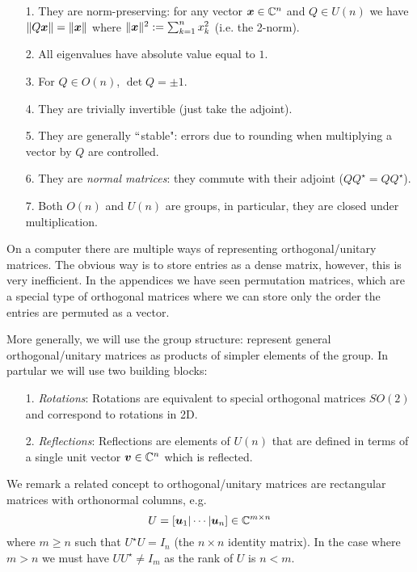 \begin{itemize}
\item[1. ] They are norm-preserving: for any vector $\bm{{\mbox{\boldmath$x$\unboldmath}}} \in {\mathbb C}^n$ and $Q \ensuremath{\in} U(n)$    we have $\|Q \bm{{\mbox{\boldmath$x$\unboldmath}}} \| = \| \bm{{\mbox{\boldmath$x$\unboldmath}}}\|$ where $\| \bm{{\mbox{\boldmath$x$\unboldmath}}} \|^2 := \sum_{k=1}^n x_k^2$ (i.e. the 2-norm).


\item[2. ] All eigenvalues have absolute value equal to $1$.


\item[3. ] For $Q \ensuremath{\in} O(n)$,  $\det Q = \ensuremath{\pm}1$.


\item[4. ] They are trivially invertible (just take the adjoint).


\item[5. ] They are generally \ensuremath{\ldq}stable": errors due to rounding when multiplying a vector by $Q$ are controlled.


\item[6. ] They are \emph{normal matrices}: they commute with their adjoint ($Q Q^\ensuremath{\star} = Q Q^\ensuremath{\star}$). 


\item[7. ] Both $O(n)$ and $U(n)$ are groups, in particular, they are closed under multiplication.

\end{itemize}
On a computer there are multiple ways of representing orthogonal/unitary matrices. The obvious way is to store entries  as a dense matrix, however, this is very inefficient. In the appendices we have seen permutation matrices, which are a special type of orthogonal matrices where we can store only the order the entries are permuted as a vector. 

More generally, we will use the group structure: represent general orthogonal/unitary matrices as products of simpler elements of the group. In partular we will use two building blocks:

\begin{itemize}
\item[1. ] \emph{Rotations}: Rotations are equivalent to special orthogonal matrices $SO(2)$  and correspond to rotations in 2D.


\item[2. ] \emph{Reflections}:  Reflections are elements of $U(n)$ that are defined in terms of a single unit vector $\bm{{\mbox{\boldmath$v$\unboldmath}}} \in {\mathbb C}^n$ which is reflected.

\end{itemize}
We remark a related concept to orthogonal/unitary matrices are rectangular matrices with orthonormal columns, e.g.
\[
U = [\bm{{\mbox{\boldmath$u$\unboldmath}}}_1 | \cdots | \bm{{\mbox{\boldmath$u$\unboldmath}}}_n] \in {\mathbb C}^{m \times n}
\]
where $m \ensuremath{\geq} n$ such that $U^\ensuremath{\star} U =  I_n$ (the $n \ensuremath{\times} n$ identity matrix). In the case where $m > n$ we must have $UU^\ensuremath{\star} \ensuremath{\neq} I_m$ as the rank of $U$ is $n < m$. 

